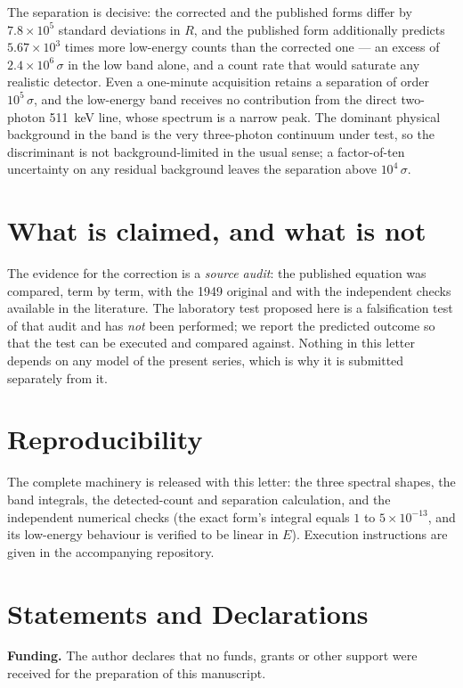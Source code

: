 \documentclass[twocolumn]{svjour3}
\begin{document}
The separation is decisive: the corrected and the published forms
differ by $7.8\times 10^{5}$ standard deviations in $R$, and the
published form additionally predicts $5.67\times 10^{3}$ times more
low-energy counts than the corrected one --- an excess of
$2.4\times 10^{6}\,\sigma$ in the low band alone, and a count rate
that would saturate any realistic detector. Even a one-minute
acquisition retains a separation of order $10^{5}\,\sigma$, and
the low-energy band receives no contribution from the direct
two-photon 511~keV line, whose spectrum is a narrow peak. The
dominant physical background in the band is the very three-photon
continuum under test, so the discriminant is not background-limited
in the usual sense; a factor-of-ten uncertainty on any residual
background leaves the separation above $10^{4}\,\sigma$.

\section{What is claimed, and what is not}
The evidence for the correction is a \emph{source audit}: the
published equation was compared, term by term, with the 1949 original
and with the independent checks available in the literature. The
laboratory test proposed here is a falsification test of that audit
and has \emph{not} been performed; we report the predicted
outcome so that the test can be executed and compared against.
Nothing in this letter depends on any model of the present series,
which is why it is submitted separately from it.

\section{Reproducibility}
The complete machinery is released with this letter: the three
spectral shapes, the band integrals, the detected-count and
separation calculation, and the independent numerical checks
(the exact form's integral equals $1$ to $5\times 10^{-13}$, and
its low-energy behaviour is verified to be linear in $E$).
Execution instructions are given in the accompanying repository.

\section*{Statements and Declarations}

\textbf{Funding.} The author declares that no funds, grants or other
support were received for the preparation of this manuscript.
\end{document}

